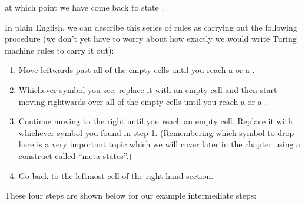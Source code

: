 at which point we have come back to state .

In plain English, we can describe this series of rules as carrying out the following procedure (we don't yet have to worry about how exactly we would write Turing machine rules to carry it out):

\begin{enumerate}
    \item Move leftwards past all of the empty cells until you reach a  or a .
    
    \item Whichever symbol you see, replace it with an empty cell and then start moving rightwards over all of the empty cells until you reach a  or a .
    
    \item Continue moving to the right until you reach an empty cell. Replace it with whichever symbol you found in step 1. (Remembering which symbol to drop here is a very important topic which we will cover later in the chapter using a construct called ``meta-states''.)
    
    \item Go back to the leftmost cell of the right-hand section.
\end{enumerate}

These four steps are shown below for our example intermediate steps:

